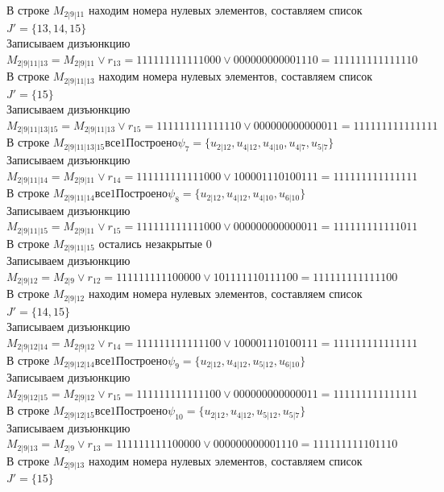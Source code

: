 \documentclass[12pt,a4paper]{report}
\begin{document}
В строке $M_{2 | 9 | 11}$ находим номера нулевых элементов, составляем список $J' = \{13, 14, 15\}$ \\
Записываем дизъюнкцию $M_{2 | 9 | 11 | 13} = M_{2 | 9 | 11}\vee r_{13} = 111111111111000 \vee 000000000001110 = 111111111111110$ \\
В строке $M_{2 | 9 | 11 | 13}$ находим номера нулевых элементов, составляем список $J' = \{15\}$ \\
Записываем дизъюнкцию $M_{2 | 9 | 11 | 13 | 15} = M_{2 | 9 | 11 | 13}\vee r_{15} = 111111111111110 \vee 000000000000011 = 111111111111111$ \\
В строке $M_{2 | 9 | 11 | 13 | 15} все 1 Построено \psi_{7} = \{u_{2 | 12},u_{4 | 12},u_{4 | 10},u_{4 | 7},u_{5 | 7}\}$ \\
Записываем дизъюнкцию $M_{2 | 9 | 11 | 14} = M_{2 | 9 | 11}\vee r_{14} = 111111111111000 \vee 100001110100111 = 111111111111111$ \\
В строке $M_{2 | 9 | 11 | 14} все 1 Построено \psi_{8} = \{u_{2 | 12},u_{4 | 12},u_{4 | 10},u_{6 | 10}\}$ \\
Записываем дизъюнкцию $M_{2 | 9 | 11 | 15} = M_{2 | 9 | 11}\vee r_{15} = 111111111111000 \vee 000000000000011 = 111111111111011$ \\
В строке $M_{2 | 9 | 11 | 15}$ остались незакрытые $0$ \\
Записываем дизъюнкцию $M_{2 | 9 | 12} = M_{2 | 9}\vee r_{12} = 111111111100000 \vee 101111110111100 = 111111111111100$ \\
В строке $M_{2 | 9 | 12}$ находим номера нулевых элементов, составляем список $J' = \{14, 15\}$ \\
Записываем дизъюнкцию $M_{2 | 9 | 12 | 14} = M_{2 | 9 | 12}\vee r_{14} = 111111111111100 \vee 100001110100111 = 111111111111111$ \\
В строке $M_{2 | 9 | 12 | 14} все 1 Построено \psi_{9} = \{u_{2 | 12},u_{4 | 12},u_{5 | 12},u_{6 | 10}\}$ \\
Записываем дизъюнкцию $M_{2 | 9 | 12 | 15} = M_{2 | 9 | 12}\vee r_{15} = 111111111111100 \vee 000000000000011 = 111111111111111$ \\
В строке $M_{2 | 9 | 12 | 15} все 1 Построено \psi_{10} = \{u_{2 | 12},u_{4 | 12},u_{5 | 12},u_{5 | 7}\}$ \\
Записываем дизъюнкцию $M_{2 | 9 | 13} = M_{2 | 9}\vee r_{13} = 111111111100000 \vee 000000000001110 = 111111111101110$ \\
В строке $M_{2 | 9 | 13}$ находим номера нулевых элементов, составляем список $J' = \{15\}$ \\
\end{document}
